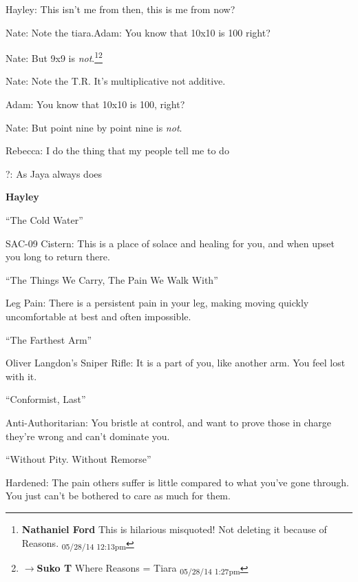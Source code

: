 Hayley: This isn't me from then, this is me from now?



Nate: Note the tiara.Adam: You know that 10x10 is 100 right?

Nate: But 9x9 is \textit{not}.\footnote{\textbf{Nathaniel Ford }This is hilarious misquoted! Not deleting it because of Reasons. \textsubscript{05/28/14 12:13pm}}\footnote{$\rightarrow$\textbf{Suko T }Where Reasons = Tiara \textsubscript{05/28/14 1:27pm}}



Nate: Note the T.R. It's multiplicative not additive.

Adam: You know that 10x10 is 100, right?

Nate: But point nine by point nine is \textit{not}.



Rebecca: I do the thing that my people tell me to do

?: As Jaya always does





\textbf{Hayley}



 ``The Cold Water''

 SAC-09 Cistern: This is a place of solace and healing for you, and when upset you long to return there.



 ``The Things We Carry, The Pain We Walk With''

 Leg Pain: There is a persistent pain in your leg, making moving quickly uncomfortable at best and often impossible.



 ``The Farthest Arm''

 Oliver Langdon's Sniper Rifle: It is a part of you, like another arm. You feel lost with it.





 ``Conformist, Last''

 Anti-Authoritarian: You bristle at control, and want to prove those in charge they're wrong and can't dominate you.



 ``Without Pity. Without Remorse''

 Hardened: The pain others suffer is little compared to what you've gone through. You just can't be bothered to care as much for them.




